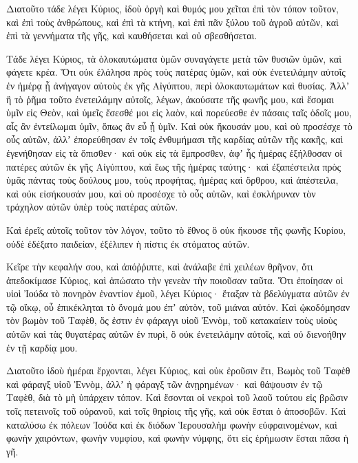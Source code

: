 {\par }{\PP {}Διατοῦτο τάδε λέγει Κύριος, ἰδοὺ ὀργὴ καὶ θυμός μου χεῖται ἐπὶ τὸν τόπον τοῦτον, καὶ ἐπὶ τοὺς ἀνθρώπους, καὶ ἐπὶ τὰ κτήνη, καὶ ἐπὶ πᾶν ξύλου τοῦ ἀγροῦ αὐτῶν, καὶ ἐπὶ τὰ γεννήματα τῆς γῆς, καὶ καυθήσεται καὶ οὐ σβεσθήσεται.
\par }{\PP {}Τάδε λέγει Κύριος, τὰ ὁλοκαυτώματα ὑμῶν συναγάγετε μετὰ τῶν θυσιῶν ὑμῶν, καὶ φάγετε κρέα.
Ὅτι οὐκ ἐλάλησα πρὸς τοὺς πατέρας ὑμῶν, καὶ οὐκ ἐνετειλάμην αὐτοῖς ἐν ἡμέρᾳ ᾗ ἀνήγαγον αὐτοὺς ἐκ γῆς Αἰγύπτου, περὶ ὁλοκαυτωμάτων καὶ θυσίας.
Ἀλλʼ ἢ τὸ ῥῆμα τοῦτο ἐνετειλάμην αὐτοῖς, λέγων, ἀκούσατε τῆς φωνῆς μου, καὶ ἔσομαι ὑμῖν εἰς Θεὸν, καὶ ὑμεῖς ἔσεσθέ μοι εἰς λαὸν, καὶ πορεύεσθε ἐν πάσαις ταῖς ὁδοῖς μου, αἷς ἂν ἐντείλωμαι ὑμῖν, ὅπως ἂν εὖ ᾖ ὑμῖν.
Καὶ οὐκ ἤκουσάν μου, καὶ οὐ προσέσχε τὸ οὖς αὐτῶν, ἀλλʼ ἐπορεύθησαν ἐν τοῖς ἐνθυμήμασι τῆς καρδίας αὐτῶν τῆς κακῆς, καὶ ἐγενήθησαν εἰς τὰ ὄπισθεν· καὶ οὐκ εἰς τὰ ἔμπροσθεν,
ἀφʼ ἧς ἡμέρας ἐξήλθοσαν οἱ πατέρες αὐτῶν ἐκ γῆς Αἰγύπτου, καὶ ἕως τῆς ἡμέρας ταύτης· καὶ ἐξαπέστειλα πρὸς ὑμᾶς πάντας τοὺς δούλους μου, τοὺς προφήτας, ἡμέρας καὶ ὄρθρου, καὶ ἀπέστειλα,
καὶ οὐκ εἰσήκουσάν μου, καὶ οὐ προσέσχε τὸ οὖς αὐτῶν, καὶ ἐσκλήρυναν τὸν τράχηλον αὐτῶν ὑπὲρ τοὺς πατέρας αὐτῶν.
\par }{\PP {}Καὶ ἐρεῖς αὐτοῖς τοῦτον τὸν λόγον,
τοῦτο τὸ ἔθνος ὃ οὐκ ἤκουσε τῆς φωνῆς Κυρίου, οὐδὲ ἐδέξατο παιδείαν, ἐξέλιπεν ἡ πίστις ἐκ στόματος αὐτῶν.
\par }{\PP {}Κεῖρε τὴν κεφαλήν σου, καὶ ἀπόῤῥιπτε, καὶ ἀνάλαβε ἐπὶ χειλέων θρῆνον, ὅτι ἀπεδοκίμασε Κύριος, καὶ ἀπώσατο τὴν γενεὰν τὴν ποιοῦσαν ταῦτα.
Ὅτι ἐποίησαν οἱ υἱοὶ Ἰούδα τὸ πονηρὸν ἐναντίον ἐμοῦ, λέγει Κύριος· ἔταξαν τὰ βδελύγματα αὐτῶν ἐν τῷ οἴκῳ, οὗ ἐπικέκληται τὸ ὄνομά μου ἐπʼ αὐτὸν, τοῦ μιάναι αὐτόν.
Καὶ ᾠκοδόμησαν τὸν βωμὸν τοῦ Ταφὲθ, ὅς ἐστιν ἐν φάραγγι υἱοῦ Ἐννὸμ, τοῦ κατακαίειν τοὺς υἱοὺς αὐτῶν καὶ τὰς θυγατέρας αὐτῶν ἐν πυρὶ, ὃ οὐκ ἐνετειλάμην αὐτοῖς, καὶ οὐ διενοήθην ἐν τῇ καρδίᾳ μου.
\par }{\PP {}Διατοῦτο ἰδοὺ ἡμέραι ἔρχονται, λέγει Κύριος, καὶ οὐκ ἐροῦσιν ἔτι, Βωμὸς τοῦ Ταφὲθ καὶ φάραγξ υἱοῦ Ἐννὸμ, ἀλλʼ ἡ φάραγξ τῶν ἀνῃρημένων· καὶ θάψουσιν ἐν τῷ Ταφὲθ, διὰ τὸ μὴ ὑπάρχειν τόπον.
Καὶ ἔσονται οἱ νεκροὶ τοῦ λαοῦ τούτου εἰς βρῶσιν τοῖς πετεινοῖς τοῦ οὐρανοῦ, καὶ τοῖς θηρίοις τῆς γῆς, καὶ οὐκ ἔσται ὁ ἀποσοβῶν.
Καὶ καταλύσω ἐκ πόλεων Ἰούδα καὶ ἐκ διόδων Ἱερουσαλὴμ φωνὴν εὐφραινομένων, καὶ φωνὴν χαιρόντων, φωνὴν νυμφίου, καὶ φωνὴν νύμφης, ὅτι εἰς ἐρήμωσιν ἔσται πᾶσα ἡ γῆ.

}
